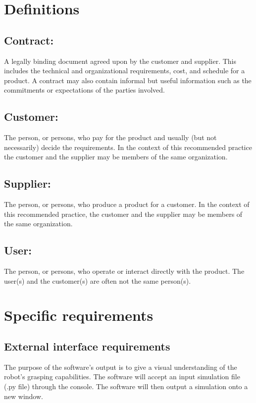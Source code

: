 \documentclass[10pt,journal,compsoc]{IEEEtran}
\begin{document}
\section{Definitions}
\subsection{\textbf{Contract:}}
A legally binding document agreed upon by the customer and supplier. This includes the technical and organizational requirements, cost, and schedule for a product. A contract may also contain informal but useful information such as the commitments or expectations of the parties involved.
 
\subsection{\textbf{Customer:}}
The person, or persons, who pay for the product and usually (but not necessarily) decide the requirements. In the context of this recommended practice the customer and the supplier may be members of the same organization.

\subsection{\textbf{Supplier:}}
The person, or persons, who produce a product for a customer. In the context of this recommended practice, the customer and the supplier may be members of the same organization.

\subsection{\textbf{User:}}
The person, or persons, who operate or interact directly with the product. The user(s) and the customer(s) are often not the same person(s).

\vfill

\newpage

\section{Specific requirements}
\vspace{5mm}

\subsection{External interface requirements}
\vspace{5mm}
The purpose of the software's output is to give a visual understanding of the robot's grasping capabilities.
The software will accept an input simulation file (.py file) through the console.
The software will then output a simulation onto a new window.
\end{document}
